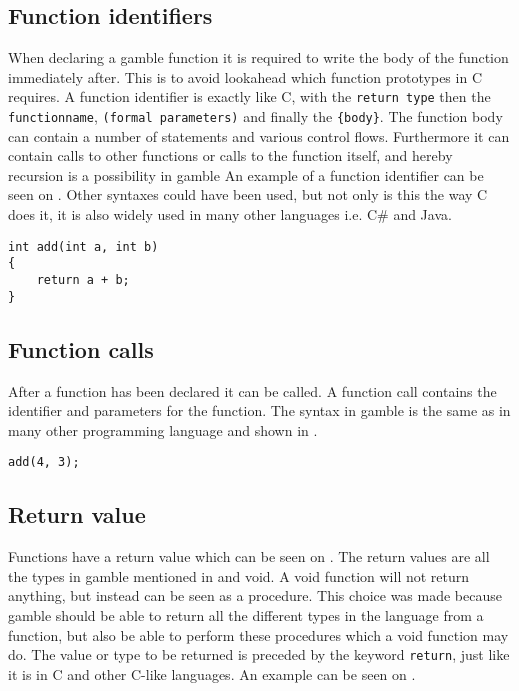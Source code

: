 \subsection*{Function identifiers}
When declaring a \gls{gamble} function it is required to write the body of the function immediately after.
This is to avoid lookahead which function prototypes in C requires.
A function identifier is exactly like C, with the \texttt{return type} then the \texttt{functionname}, \texttt{(formal parameters)} and finally the \texttt{\{body\}}.
The function body can contain a number of statements and various control flows.
Furthermore it can contain calls to other functions or calls to the function itself, and hereby recursion is a possibility in \gls{gamble}
An example of a function identifier can be seen on .
Other syntaxes could have been used, but not only is this the way C does it, it is also widely used in many other languages i.e. C\# and Java.

\begin{lstlisting}[caption={Function Identifier},label={lst:functionID},numbers=none]                                                        
int add(int a, int b)
{
    return a + b;
}
\end{lstlisting}

\subsection*{Function calls}
After a function has been declared it can be called. 
A function call contains the identifier and parameters for the function. 
The syntax in \gls{gamble} is the same as in many other programming language and shown in . 

\begin{lstlisting}[caption={A function call in \gls{gamble}},label={lst:functionCall},numbers=none]
add(4, 3);
\end{lstlisting}


\subsection*{Return value}
Functions have a return value which can be seen on .
The return values are all the types in \gls{gamble} mentioned in  and void. 
A void function will not return anything, but instead can be seen as a procedure.
This choice was made because \gls{gamble} should be able to return all the different types in the language from a function, but also be able to perform these procedures which a void function may do.
The value or type to be returned is preceded by the keyword \texttt{return}, just like it is in C and other C-like languages.
An example can be seen on .

